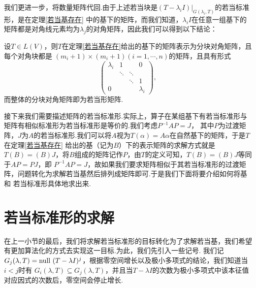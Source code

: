 我们更进一步，将数量矩阵代回.由于上述若当块是$(T-\lambda_iI)|_{G(\lambda_i,T)}$的若当标准形，是在定理\ref{若当基存在}
中的基下的矩阵，而我们知道，$\lambda_iI$在任意一组基下的矩阵都是对角线元素均为$\lambda_j$的对角矩阵，因此我们可以得到以下结论：
\begin{theorem}
	设$T\in L(V)$，则$T$在定理\textup{\ref{若当基存在}}给出的基下的矩阵表示为分块对角矩阵，且每个对角块都是
	$(m_i+1)\times(m_i+1)(i=1,\cdots,n)$的矩阵，且具有形式$$\begin{pmatrix}
		\lambda_i & 1 &  & 0 \\  & \ddots & \ddots &  \\  &  &  \ddots & 1 \\ 0 &  &  & \lambda_i
	\end{pmatrix},$$而整体的分块对角矩阵即为若当形矩阵.
\end{theorem}
接下来我们需要描述矩阵的若当标准形.实际上，算子在某组基下有若当标准形与矩阵有相似标准形为若当标准形是等价的.我们考虑$P^{-1}AP=J$，
其中$P$为过渡矩阵，$J$为$A$的若当标准形.我们可以将$A$视为$T(\alpha)=A\alpha$在自然基下的矩阵，于是$T$在定理\ref{若当基存在}
给出的基（记为$B$）下的表示矩阵的求解方式就是$T(B)=(B)J$，将$B$组成的矩阵记作$P$，由$T$的定义可知，$T(B)=(B)J$等同于$AP=PJ$，即
$P^{-1}AP=J$，故如果我们要求矩阵相似于其若当标准形的过渡矩阵，问题转化为求解若当基然后排列成矩阵即可.于是我们下面将要介绍如何将基和
若当标准形具体地求出来.

\section{若当标准形的求解}
在上一小节的最后，我们将求解若当标准形的目标转化为了求解若当基，我们希望有更加算法化的方式去实现这一目标.为此，我们先引入一些记号.
我们记$G_j(\lambda,T)=\textup{null }(T-\lambda I)^j$，根据零空间增长以及极小多项式的结论，我们知道当$i<j$时有
$G_i(\lambda,T)\subseteq G_j(\lambda,T)$，并且当$T-\lambda I$的次数为极小多项式中该本征值对应因式的次数后，零空间会停止增长.

